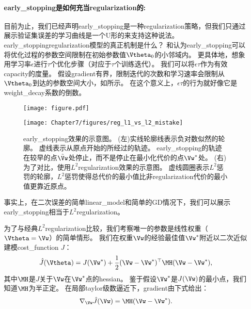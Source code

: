 
\paragraph{\gls{early_stopping}是如何充当\gls{regularization}的:}
目前为止，我们已经声明\gls{early_stopping}是一种\gls{regularization}策略，但我们只通过展示验证集误差的学习曲线是一个U形的来支持这种说法。
\gls{early_stopping}\gls{regularization}模型的真正机制是什么？ 
\cite{Bishop1995}和\cite{Sjoberg95}认为\gls{early_stopping}可以将优化过程的参数空间限制在初始参数值$\Vtheta_0$的小邻域内。
更具体地，想象用学习率$\epsilon$进行$\tau$个优化步骤（对应于$\tau$个训练迭代）。
我们可以将$\epsilon \tau$作为有效\gls{capacity}的度量。
假设\gls{gradient}有界，限制迭代的次数和学习速率会限制从$\Vtheta_0$到达的参数空间大小，如所示。
在这个意义上，$\epsilon \tau$的行为就好像它是\gls{weight_decay}系数的倒数。

\begin{figure}[!htb]
\ifOpenSource
\centerline{\texttt{[image: figure.pdf]}}
\else
\centerline{\texttt{[image: Chapter7/figures/reg\_l1\_vs\_l2\_mistake]}}
\fi
\caption{\gls{early_stopping}效果的示意图。
(左)实线轮廓线表示负对数似然的轮廓。
虚线表示从原点开始的所经过的轨迹。 %
\gls{early_stopping}的轨迹在较早的点$\tilde \Vw$处停止，而不是停止在最小化代价的点$\Vw^*$处。
(右)为了对比，使用$L^2$\gls{regularization}效果的示意图。
虚线圆圈表示$L^2$惩罚的轮廓，$L^2$惩罚使得总代价的最小值比非\gls{regularization}代价的最小值更靠近原点。
}
\label{fig:chap7_reg_l1_vs_l2_mistake}
\end{figure}

事实上，在二次误差的简单\gls{linear_model}和简单的\gls{GD}情况下，我们可以展示\gls{early_stopping}相当于$L^2$\gls{regularization}。

为了与经典$L^2$\gls{regularization}比较，我们考察唯一的参数是线性权重（$\Vtheta = \Vw$）的简单情形。
我们在权重$\Vw$的经验最佳值$\Vw^*$附近以二次近似建模\gls{cost_function} $J$：
\begin{align}
 \hat J(\Vtheta) = J(\Vw^*) + \frac{1}{2}  (\Vw- \Vw^*)^\top \MH  (\Vw - \Vw^*),
\end{align}
其中$\MH$是$J$关于$\Vw$在$\Vw^*$点的\gls{hessian}。
鉴于假设$\Vw^*$是$J(\Vw)$的最小点，我们知道$\MH$为半正定。
在局部\gls{taylor}级数逼近下，\gls{gradient}由下式给出：
\begin{align}
 \nabla_{\Vw} \hat J (\Vw) = \MH (\Vw - \Vw^*).
\end{align}

